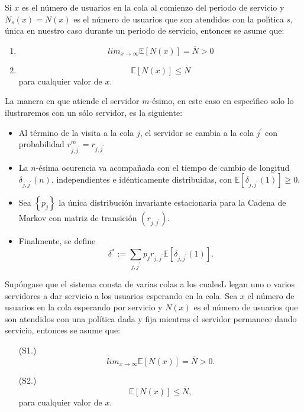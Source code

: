 \documentclass{article}
\newcommand{\esp}{\mathbb{E}}
\begin{document}
Si $x$ es el n{\'u}mero de usuarios en la cola al comienzo del
periodo de servicio y $N_{s}\left(x\right)=N\left(x\right)$ es el
n{\'u}mero de usuarios que son atendidos con la pol{\'\i}tica $s$,
{\'u}nica en nuestro caso durante un periodo de servicio, entonces
se asume que:
\begin{enumerate}
\item
\begin{equation}\label{S1}
lim_{x\rightarrow\infty}\esp\left[N\left(x\right)\right]=\overline{N}>0
\end{equation}
\item
\begin{equation}\label{S2}
\esp\left[N\left(x\right)\right]\leq \overline{N} \end{equation}
para cualquier valor de $x$.
\end{enumerate}
La manera en que atiende el servidor $m$-{\'e}simo, en este caso
en espec{\'\i}fico solo lo ilustraremos con un s{\'o}lo servidor,
es la siguiente:
\begin{itemize}
\item Al t{\'e}rmino de la visita a la cola $j$, el servidor se
cambia a la cola $j^{'}$ con probabilidad
$r_{j,j^{'}}^{m}=r_{j,j^{'}}$

\item La $n$-{\'e}sima ocurencia va acompa{\~n}ada con el tiempo
de cambio de longitud $\delta_{j,j^{'}}\left(n\right)$,
independientes e id{\'e}nticamente distribuidas, con
$\esp\left[\delta_{j,j^{'}}\left(1\right)\right]\geq0$.

\item Sea $\left\{p_{j}\right\}$ la {\'u}nica distribuci{\'o}n
invariante estacionaria para la Cadena de Markov con matriz de
transici{\'o}n $\left(r_{j,j^{'}}\right)$.

\item Finalmente, se define
\begin{equation}
\delta^{*}:=\sum_{j,j^{'}}p_{j}r_{j,j^{'}}\esp\left[\delta_{j,j^{'}}\left(1\right)\right].
\end{equation}
\end{itemize}




Sup\'ongase que el sistema consta de varias colas a los cualesL legan uno o varios servidores a dar servicio a los usuarios esperando en la cola. Sea $x$ el n\'umero de usuarios en la cola esperando por servicio y $N\left(x\right)$ es el n\'umero de usuarios que son atendidos con una pol\'itica dada y fija mientras el servidor permanece dando servicio, entonces se asume que:
\begin{itemize}
\item[(S1.)]
\begin{equation}\label{S1}
lim_{x\rightarrow\infty}\esp\left[N\left(x\right)\right]=\overline{N}>0.
\end{equation}
\item[(S2.)]
\begin{equation}\label{S2}
\esp\left[N\left(x\right)\right]\leq \overline{N},
\end{equation}
para cualquier valor de $x$.
\end{itemize}
\end{document}
